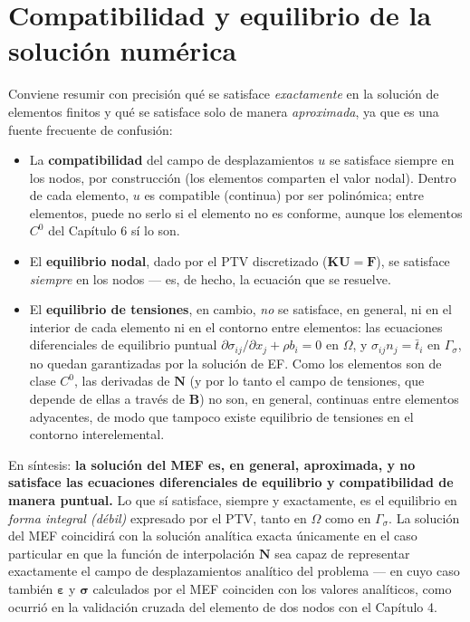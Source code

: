 \section{Compatibilidad y equilibrio de la solución numérica}

\begin{observacion}
Conviene resumir con precisión qué se satisface \emph{exactamente} en la solución de elementos finitos y qué se satisface solo de manera \emph{aproximada}, ya que es una fuente frecuente de confusión:
\begin{itemize}
  \item La \textbf{compatibilidad} del campo de desplazamientos $u$ se satisface siempre en los nodos, por construcción (los elementos comparten el valor nodal). Dentro de cada elemento, $u$ es compatible (continua) por ser polinómica; entre elementos, puede no serlo si el elemento no es conforme, aunque los elementos $C^0$ del Capítulo 6 sí lo son.
  \item El \textbf{equilibrio nodal}, dado por el PTV discretizado ($\bm K\bm U=\bm F$), se satisface \emph{siempre} en los nodos --- es, de hecho, la ecuación que se resuelve.
  \item El \textbf{equilibrio de tensiones}, en cambio, \emph{no} se satisface, en general, ni en el interior de cada elemento ni en el contorno entre elementos: las ecuaciones diferenciales de equilibrio puntual $\partial\sigma_{ij}/\partial x_j+\rho b_i=0$ en $\Omega$, y $\sigma_{ij}n_j=\bar t_i$ en $\Gamma_\sigma$, no quedan garantizadas por la solución de EF. Como los elementos son de clase $C^0$, las derivadas de $\bm N$ (y por lo tanto el campo de tensiones, que depende de ellas a través de $\bm B$) no son, en general, continuas entre elementos adyacentes, de modo que tampoco existe equilibrio de tensiones en el contorno interelemental.
\end{itemize}
En síntesis: \textbf{la solución del MEF es, en general, aproximada, y no satisface las ecuaciones diferenciales de equilibrio y compatibilidad de manera puntual.} Lo que sí satisface, siempre y exactamente, es el equilibrio en \emph{forma integral (débil)} expresado por el PTV, tanto en $\Omega$ como en $\Gamma_\sigma$. La solución del MEF coincidirá con la solución analítica exacta únicamente en el caso particular en que la función de interpolación $\bm N$ sea capaz de representar exactamente el campo de desplazamientos analítico del problema --- en cuyo caso también $\bm\varepsilon$ y $\bm\sigma$ calculados por el MEF coinciden con los valores analíticos, como ocurrió en la validación cruzada del elemento de dos nodos con el Capítulo 4.
\end{observacion}

